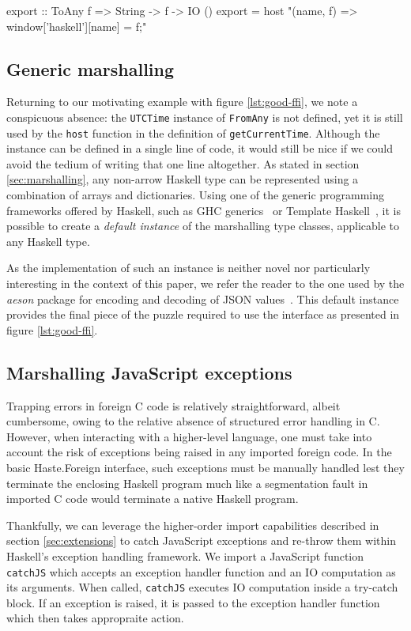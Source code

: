 \documentclass[preprint]{sigplanconf}
\begin{document}
\begin{code}
export :: ToAny f => String -> f -> IO ()
export =
  host "(name, f) => window['haskell'][name] = f;"
\end{code}

\subsection{Generic marshalling}
\label{sec:default-instances}
Returning to our motivating example with figure \ref{lst:good-ffi}, we note
a conspicuous absence: the \lstinline!UTCTime! instance of \lstinline!FromAny!
is not defined, yet it is still used by the \lstinline!host! function in the
definition of \lstinline!getCurrentTime!. Although the instance can be defined
in a single line of code, it would still be nice if we could avoid the tedium
of writing that one line altogether. As stated in section
\ref{sec:marshalling}, any non-arrow Haskell type can be represented using
a combination of arrays and dictionaries. Using one of the generic programming
frameworks offered by Haskell, such as GHC generics\ \cite{generics} or
Template Haskell\ \cite{th}, it is possible to create a \emph{default instance}
of the marshalling type classes, applicable to any Haskell type.

As the implementation of such an instance is neither novel nor particularly
interesting in the context of this paper, we refer the reader to the one
used by the \emph{aeson} package for encoding and decoding of
JSON values\ \cite{aeson}. This default instance provides the final piece
of the puzzle required to use the interface as presented in
figure \ref{lst:good-ffi}.


\subsection{Marshalling JavaScript exceptions}
\label{sec:marshalling-exceptions}
Trapping errors in foreign C code is relatively straightforward, albeit
cumbersome, owing to the relative absence of structured error handling in C.
However, when interacting with a higher-level language, one must take into
account the risk of exceptions being raised in any imported foreign code.
In the basic Haste.Foreign interface, such exceptions must be manually handled
lest they terminate the enclosing Haskell program much like a segmentation
fault in imported C code would terminate a native Haskell program.

Thankfully, we can leverage the higher-order import capabilities described
in section \ref{sec:extensions} to catch JavaScript exceptions and re-throw
them within Haskell's exception handling framework.
We import a JavaScript function \lstinline!catchJS! which accepts an
exception handler function and an IO computation as its arguments.
When called, \lstinline!catchJS! executes IO computation inside a try-catch
block. If an exception is raised, it is passed to the exception handler
function which then takes appropraite action.
\end{document}
